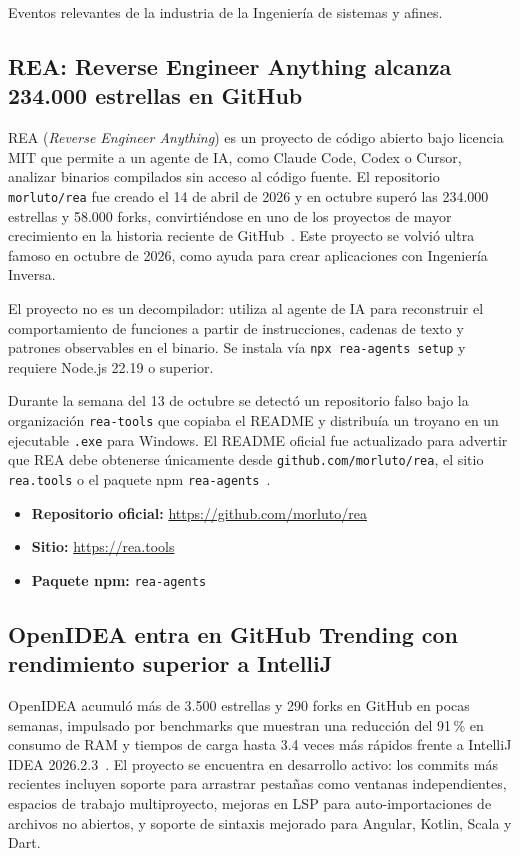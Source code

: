 \documentclass[conference]{IEEEtran}
\begin{document}
Eventos relevantes de la industria de la
Ingeniería de sistemas y afines.

\subsection{REA: Reverse Engineer Anything alcanza 234.000 estrellas en GitHub}

REA (\textit{Reverse Engineer Anything}) es un proyecto de código
abierto bajo licencia MIT que permite a un agente de IA, como Claude
Code, Codex o Cursor, analizar binarios compilados sin acceso al
código fuente. El repositorio \texttt{morluto/rea} fue creado el 14
de abril de 2026 y en octubre superó las 234.000 estrellas y 58.000
forks, convirtiéndose en uno de los proyectos de mayor crecimiento
en la historia reciente de GitHub~\cite{rea}.
Este proyecto se volvió ultra famoso en octubre de 2026, como
ayuda para crear aplicaciones con Ingeniería Inversa.

El proyecto no es un decompilador: utiliza al agente de IA para
reconstruir el comportamiento de funciones a partir de instrucciones,
cadenas de texto y patrones observables en el binario. Se instala
vía \texttt{npx rea-agents setup} y requiere Node.js 22.19 o superior.

Durante la semana del 13 de octubre se detectó un repositorio
falso bajo la organización \texttt{rea-tools} que copiaba el README
y distribuía un troyano en un ejecutable \texttt{.exe} para Windows.
El README oficial fue actualizado para advertir que REA debe obtenerse
únicamente desde \texttt{github.com/morluto/rea}, el sitio
\texttt{rea.tools} o el paquete npm \texttt{rea-agents}~\cite{rea}.

\begin{itemize}
  \item \textbf{Repositorio oficial:} \url{https://github.com/morluto/rea}
  \item \textbf{Sitio:} \url{https://rea.tools}
  \item \textbf{Paquete npm:} \texttt{rea-agents}
\end{itemize}

\subsection{OpenIDEA entra en GitHub Trending con rendimiento
superior a IntelliJ}

OpenIDEA acumuló más de 3.500 estrellas y 290 forks en GitHub en
pocas semanas, impulsado por benchmarks que muestran una reducción
del 91\,\% en consumo de RAM y tiempos de carga hasta 3.4 veces
más rápidos frente a IntelliJ IDEA 2026.2.3~\cite{openidea}. El
proyecto se encuentra en desarrollo activo: los commits más recientes
incluyen soporte para arrastrar pestañas como ventanas independientes,
espacios de trabajo multiproyecto, mejoras en LSP para auto-importaciones
de archivos no abiertos, y soporte de sintaxis mejorado para Angular,
Kotlin, Scala y Dart.
\end{document}
